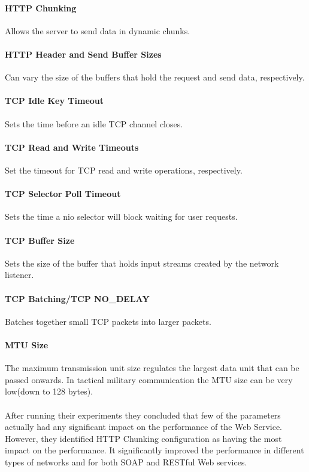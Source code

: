\paragraph{HTTP Chunking} Allows the server to send data in dynamic chunks.

\paragraph{HTTP Header and Send Buffer Sizes} Can vary the size of the buffers
that hold the request and send data, respectively.

\paragraph{TCP Idle Key Timeout} Sets the time before an idle TCP channel
closes.

\paragraph{TCP Read and Write Timeouts} Set the timeout for TCP read and write
operations, respectively.

\paragraph{TCP Selector Poll Timeout} Sets the time a \gls{nio} selector will
block waiting for user requests.

\paragraph{TCP Buffer Size} Sets the size of the buffer that holds input streams
created by the network listener.

\paragraph{TCP Batching/TCP NO\_DELAY} Batches together small TCP packets into
larger packets.

\paragraph{MTU Size} The maximum transmission unit size regulates the largest
data unit that can be passed onwards. In tactical military communication the MTU
size can be very low(down to 128 bytes).

\paragraph{}
After running their experiments they concluded that few of the parameters
actually had any significant impact on the performance of the Web Service.
However, they identified HTTP Chunking configuration as having the most impact
on the performance. It significantly improved the performance in different types
of networks and for both SOAP and RESTful Web services.



